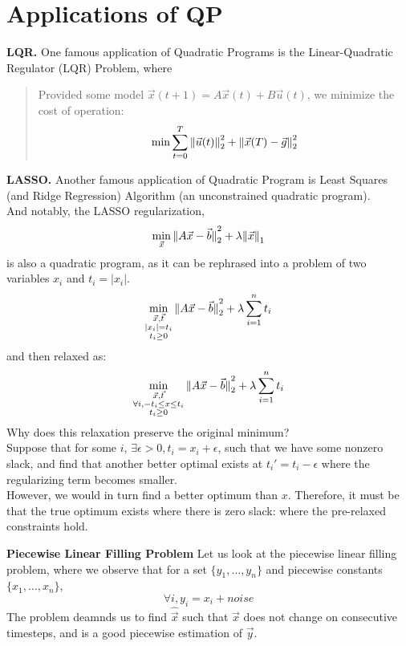 \section{Applications of QP}
\textbf{LQR.} One famous application of Quadratic Programs is the Linear-Quadratic Regulator (LQR) Problem, where
\begin{quote}
    Provided some model $\vec{x}(t + 1) = A \vec{x}(t) + B \vec{u}(t)$, we minimize the cost of operation:
    \[
        \min \sum_{t = 0}^T \pnorm[2]{\vec{u}(t)}{2} + \pnorm[2]{\vec{x}(T) - \vec{g}}{2}
    \]
\end{quote}

\textbf{LASSO.} Another famous application of Quadratic Program is Least Squares (and Ridge Regression) Algorithm (an unconstrained quadratic program). \\
And notably, the LASSO regularization,
\[
    \min_{\vec{x}} \pnorm[2]{A \vec{x} - \vec{b}}{2} + \lambda \pnorm{\vec{x}}{1}
\]
is also a quadratic program, as it can be rephrased into a problem of two variables $x_i$ and $t_i = |x_i|$. \\
\[
    \min_{
        \substack{
            \vec{x}, \vec{t} \\
            |x_i| = t_i \\
            t_i \geq 0
        }
    } \pnorm[2]{A \vec{x} - \vec{b}}{2} + \lambda \sum_{i = 1}^n t_i
\]
and then relaxed as:
\[
    \min_{
        \substack{
            \vec{x}, \vec{t} \\
            \forall i, -t_i \leq x \leq t_i \\
            t_i \geq 0
        }
    } \pnorm[2]{A \vec{x} - \vec{b}}{2} + \lambda \sum_{i = 1}^n t_i
\]
Why does this relaxation preserve the original minimum? \\
Suppose that for some $i$, $\exists \epsilon > 0, t_i = x_i + \epsilon$, such that we have some nonzero slack, and find that another better optimal exists at ${t_i}' = t_i - \epsilon$ where the regularizing term becomes smaller. \\
However, we would in turn find a better optimum than $x$. Therefore, it must be that the true optimum exists where there is zero slack: where the pre-relaxed constraints hold.

\textbf{Piecewise Linear Filling Problem}
Let us look at the piecewise linear filling problem, where we observe that for a set $\{y_1, \dots, y_n\}$ and piecewise constants $\{x_1, \dots, x_n\}$,
\[
    \forall i, y_i = x_i + noise
\]
The problem deamnds us to find $\hat{\vec{x}}$ such that $\hat{\vec{x}}$ does not change on consecutive timesteps, and is a good piecewise estimation of $\vec{y}$.

